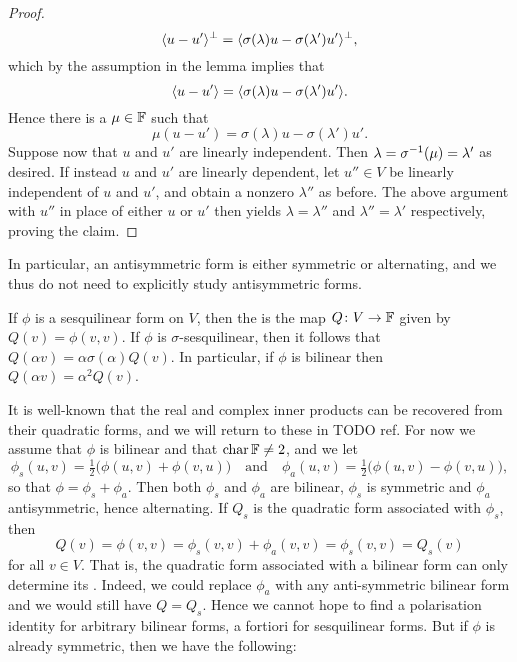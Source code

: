 \begin{proof}
\begin{equation*}
        \langle u - u'\rangle^\perp
            = \langle\sigma(\lambda)u - \sigma(\lambda')u'\rangle^\perp,
    \end{equation*}
    which by the assumption in the lemma implies that
    \begin{equation*}
        \langle u - u'\rangle
            = \langle\sigma(\lambda)u - \sigma(\lambda')u'\rangle.
    \end{equation*}
    Hence there is a $\mu \in \mathbb{F}$ such that
    \begin{equation*}
        \mu(u - u') = \sigma(\lambda)u - \sigma(\lambda')u'.
    \end{equation*}
    Suppose now that $u$ and $u'$ are linearly independent. Then $\lambda = \sigma^{-1}(\mu) = \lambda'$ as desired. If instead $u$ and $u'$ are linearly dependent, let $u'' \in V$ be linearly independent of $u$ and $u'$, and obtain a nonzero $\lambda''$ as before. The above argument with $u''$ in place of either $u$ or $u'$ then yields $\lambda = \lambda''$ and $\lambda'' = \lambda'$ respectively, proving the claim.
\end{proof}
%
In particular, an antisymmetric form is either symmetric or alternating, and we thus do not need to explicitly study antisymmetric forms.


If $\phi$ is a sesquilinear form on $V$, then the  is the map $Q \colon V \to \mathbb{F}$ given by $Q(v) = \phi(v,v)$. If $\phi$ is $\sigma$-sesquilinear, then it follows that $Q(\alpha v) = \alpha \sigma(\alpha) Q(v)$. In particular, if $\phi$ is bilinear then $Q(\alpha v) = \alpha^2 Q(v)$.

It is well-known that the real and complex inner products can be recovered from their quadratic forms, and we will return to these in TODO ref. For now we assume that $\phi$ is bilinear and that $\operatorname{char} \mathbb{F} \neq 2$, and we let
%
\begin{equation*}
    \phi_s(u,v)
        = \tfrac{1}{2} \bigl( \phi(u,v) + \phi(v,u) \bigr)
    \quad \text{and} \quad
    \phi_a(u,v)
        = \tfrac{1}{2} \bigl( \phi(u,v) - \phi(v,u) \bigr),
\end{equation*}
%
so that $\phi = \phi_s + \phi_a$. Then both $\phi_s$ and $\phi_a$ are bilinear, $\phi_s$ is symmetric and $\phi_a$ antisymmetric, hence alternating. If $Q_s$ is the quadratic form associated with $\phi_s$, then
%
\begin{equation*}
    Q(v)
        = \phi(v,v)
        = \phi_s(v,v) + \phi_a(v,v)
        = \phi_s(v,v)
        = Q_s(v)
\end{equation*}
%
for all $v \in V$. That is, the quadratic form associated with a bilinear form can only determine its . Indeed, we could replace $\phi_a$ with any anti-symmetric bilinear form and we would still have $Q = Q_s$. Hence we cannot hope to find a polarisation identity for arbitrary bilinear forms, a fortiori for sesquilinear forms. But if $\phi$ is already symmetric, then we have the following:

